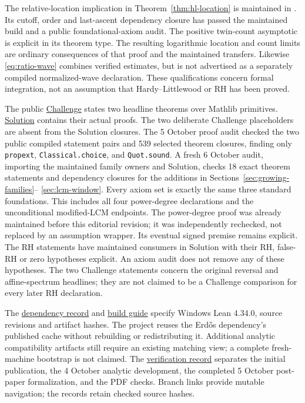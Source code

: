 \documentclass[11pt]{article}
\theoremstyle{definition}
\begin{document}
The relative-location implication in
Theorem~\ref{thm:hl-location} is maintained in
.
Its cutoff, order and last-ascent dependency closure has passed the
maintained build and a public foundational-axiom audit. The positive
twin-count asymptotic is explicit in its theorem type. The resulting logarithmic
location and count limits are ordinary consequences of that proof
and the maintained transfers. Likewise \eqref{eq:ratio-wave}
combines verified estimates, but is not advertised as a separately
compiled normalized-wave declaration. These qualifications concern
formal integration, not an assumption that Hardy--Littlewood or RH
has been proved.

The public
\href{https://github.com/kimihiro64/prime-factor-oscillations/blob/main/Challenge.lean}{Challenge}
states two headline theorems over Mathlib primitives.
\href{https://github.com/kimihiro64/prime-factor-oscillations/blob/main/Solution.lean}{Solution}
contains their actual proofs. The two deliberate Challenge
placeholders are absent from the Solution closures.
The 5 October proof audit checked the two public compiled statement
pairs and 539 selected theorem closures, finding only \texttt{propext},
\texttt{Classical.choice}, and \texttt{Quot.sound}.
A fresh 6 October audit, importing the maintained family owners and
Solution, checks 18 exact theorem statements and dependency closures
for the additions in Sections~\ref{sec:growing-families}--
\ref{sec:lcm-window}. Every axiom set is exactly the same three
standard foundations. This includes all four power-degree
declarations and the unconditional modified-LCM endpoints.
The power-degree proof was already maintained before this editorial
revision; it was independently rechecked, not replaced by an
assumption wrapper. Its eventual signed premise remains explicit.
The RH statements have maintained consumers in Solution with their
RH, false-RH or zero hypotheses explicit. An axiom audit does not
remove any of these hypotheses. The two Challenge statements concern
the original reversal and affine-spectrum headlines; they are not
claimed to be a Challenge comparison for every later RH declaration.

The
\href{https://github.com/kimihiro64/prime-factor-oscillations/blob/main/DEPENDENCY_REUSE.md}{dependency record}
and
\href{https://github.com/kimihiro64/prime-factor-oscillations/blob/main/BUILD.md}{build guide}
specify Windows Lean 4.34.0, source revisions and artifact hashes.
The project reuses the Erd\H{o}s dependency's published cache
without rebuilding or redistributing it. Additional analytic
compatibility artifacts still require an existing matching view;
a complete fresh-machine bootstrap is not claimed. The
\href{https://github.com/kimihiro64/prime-factor-oscillations/blob/main/paper/VERIFICATION.md}{verification record}
separates the initial publication, the 4 October analytic development,
the completed 5 October post-paper formalization, and the PDF checks.
Branch links provide mutable navigation; the records retain
checked source hashes.
\end{document}
